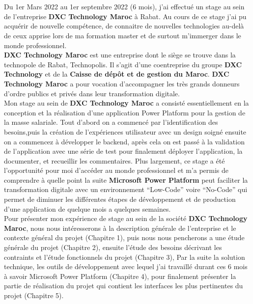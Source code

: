 \titlespacing*{\chapter}{0pt}{0in}{0.3in}
\chapter*{}
\titlespacing*{\chapter}{0pt}{0.45in}{0.3in}%

\vspace{1cm}

Du 1er Mars 2022 au 1er septembre 2022 (6 mois), j’ai effectué un stage au sein de l’entreprise \textbf{DXC Technology Maroc} à Rabat. Au cours de ce stage j'ai pu acquérir de nouvelle compétence, de connaitre de nouvelles technologies au-delà de ceux apprise lors de ma formation master et de surtout m'immerger dans le monde professionnel. \\ 

\textbf{DXC Technology Maroc} est une entreprise dont le siège se trouve dans la technopole de Rabat, Technopolis. Il s’agit d’une coentreprise du groupe \textbf{DXC Technology} et de la \textbf{Caisse de dépôt et de gestion du Maroc}. \textbf{DXC Technology Maroc} a pour vocation d’accompagner les très grands donneurs d’ordre publics et privés dans leur transformation digitale.\\ 

Mon stage au sein de \textbf{DXC Technology Maroc} a consisté essentiellement en la conception et la réalisation d'une application Power Platform pour la gestion de la masse salariale. Tout d'abord on a commencé par l'identification des besoins,puis la création de l'expériences utilisateur avec un design soigné ensuite on a commencez à développer le backend, après cela on est passé à la validation de l'application avec une série de test pour finalement déployer l'application, la documenter, et recueillir les commentaires. Plus largement, ce stage a été l’opportunité pour moi d'accéder au monde professionnel et m’a permis de comprendre à quelle point la suite \textbf{Microsoft Power Platform} peut faciliter la transformation digitale avec un environnement “Low-Code” voire “No-Code” qui permet de diminuer les différentes étapes de développement et de production d'une application de quelque mois a quelques semaines.\\

Pour présenter mon expérience de stage au sein de la société \textbf{DXC Technology Maroc}, nous nous intéresserons à la description générale de l’entreprise et le contexte général du projet (Chapitre 1), puis nous nous pencherons a une étude générale du projet (Chapitre 2), ensuite l’étude des besoins décrivant les contraints et l’étude fonctionnels du projet (Chapitre 3), Par la suite la solution technique, les outils de développement avec lequel j’ai travaillé durant ces 6 mois à savoir Microsoft Power Platform (Chapitre 4), pour finalement présenter la partie de réalisation du projet qui contient les interfaces les plus pertinentes du projet (Chapitre 5).


\newpage